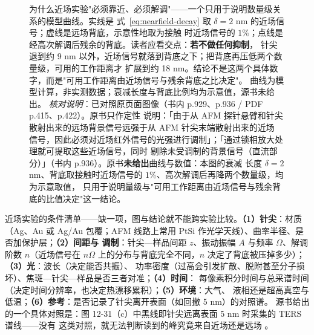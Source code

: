 \begin{figure}[htbp]
\centering
{}
\caption{为什么近场实验"必须靠近、必须解调"——一个只用于说明数量级关系的模型曲线。实线是
式~\eqref{eq:nearfield-decay} 取 $\delta=2$ nm 的近场信号；虚线是远场背底，示意性地取为接触
时近场信号的 $1\%$；点线是经高次解调后残余的背底。读者应看交点：\textbf{若不做任何抑制}，
针尖退到约 9 nm 以外，近场信号就落到背底之下；把背底再压低两个数量级，可用的工作距离才
扩展到约 18 nm。结论不是这两个具体数字，而是"可用工作距离由近场信号与残余背底之比决定"。
\modelmark 曲线为模型计算，非实测数据；衰减长度与背底比例均为示意值，源书未给出。
\emph{核对说明}：已对照原页面图像（书内 p.929、p.936 / PDF p.415、p.422）。原书只作定性
说明：「由于从 AFM 探针悬臂和针尖散射出来的远场背景信号远强于从 AFM 针尖末端散射出来的近场
信号，因此必须对近场红外信号的光强进行调制」；「通过锁相放大处理就可提取这些近场信号，同时
剔除未受调制的背景信号（直流部分）」（书内 p.936）。原书\textbf{未给出}曲线与数值：本图的衰减
长度 $\delta=2$ nm、背底取接触时近场信号的 $1\%$、高次解调后再降两个数量级，均为示意取值，
只用于说明量级与"可用工作距离由近场信号与残余背底的比值决定"这一结论。
}
\label{fig:nearfield-decay}
\end{figure}

\begin{measure}
近场实验的条件清单——缺一项，图与结论就不能跨实验比较。\textbf{（1）针尖}：材质（Ag、Au 或
Ag/Au 包覆；AFM 线路上常用 PtSi 作光学天线）、曲率半径、是否加保护层；\textbf{（2）间距与
调制}：针尖—样品间距 $z$、振动振幅 $A$ 与频率 $\Omega$、解调阶数 $n$（近场信号在 $n\Omega$
上的分布与背底完全不同，$n$ 决定了背底被压掉多少）；\textbf{（3）光}：波长（决定能否共振）、
功率密度（过高会引发扩散、脱附甚至分子损坏）、焦斑—针尖—样品是否三者对准；\textbf{（4）时间}：
每像素积分时间与总采谱时间（决定时间分辨率，也决定热漂移累积）；\textbf{（5）环境}：大气、
液相还是超高真空与低温；\textbf{（6）参考}：是否记录了针尖离开表面（如回撤 5 nm）的对照谱。
源书给出的一个具体对照是：图 12-31（c）中黑线即针尖远离表面 5 nm 时采集的 TERS 谱线——没有
这类对照，就无法判断读到的峰究竟来自近场还是远场
。
\end{measure}


